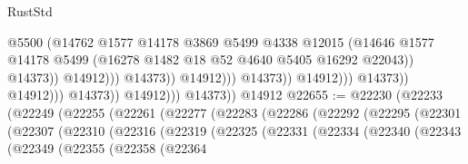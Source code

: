 \begin{lexlean}{RustStd}
\begin{coremodule}
                                                        @5500
                                                        (@14762
                                                          @1577
                                                          @14178
                                                          @3869
                                                          @5499
                                                          @4338
                                                          @12015
                                                          (@14646
                                                            @1577
                                                            @14178
                                                            @5499
                                                            (@16278
                                                              @1482
                                                              @18
                                                              @52
                                                              @4640
                                                              @5405
                                                              @16292
                                                              @22043))
                                                          @14373))
                                                      @14912)))
                                                @14373))
                                            @14912)))
                                      @14373))
                                  @14912)))
                            @14373))
                        @14912)))
                  @14373))
              @14912)))
        @14373))
    @14912
@22655 := @22230
    (@22233
      (@22249
        (@22255
          (@22261
            (@22277
              (@22283
                (@22286
                  (@22292
                    (@22295
                      (@22301
                        (@22307
                          (@22310
                            (@22316
                              (@22319
                                (@22325
                                  (@22331
                                    (@22334
                                      (@22340
                                        (@22343
                                          (@22349
                                            (@22355
                                              (@22358
                                                (@22364

\end{coremodule}
\end{lexlean}
